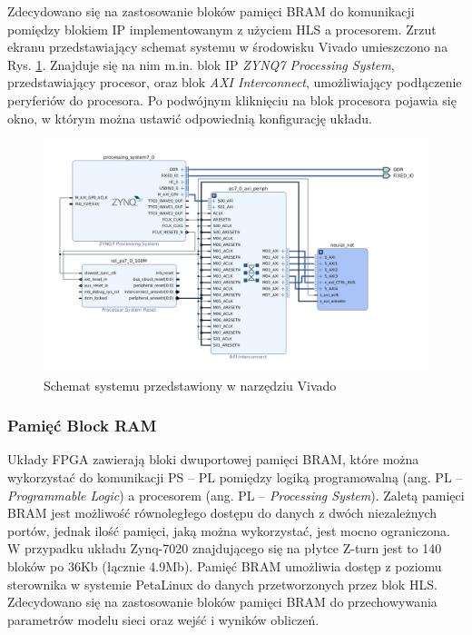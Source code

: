 Zdecydowano się na zastosowanie bloków pamięci BRAM do komunikacji pomiędzy 
blokiem IP implementowanym z użyciem HLS a procesorem. Zrzut ekranu przedstawiający 
schemat systemu w środowisku Vivado umieszczono na Rys. \ref{vivado-block-design}.
Znajduje się na nim m.in. blok IP \emph{ZYNQ7 Processing System}, przedstawiający 
procesor, oraz blok \emph{AXI Interconnect}, umożliwiający podłączenie peryferiów 
do procesora. Po podwójnym kliknięciu na blok procesora pojawia się okno, w którym
można ustawić odpowiednią konfigurację układu. 

\begin{figure}[!h]
  \centering
  \includegraphics[width=\textwidth]{img/vivado-block-design.png}
  \caption{Schemat systemu przedstawiony w narzędziu Vivado}
  \label{vivado-block-design}
\end{figure}

\subsubsection{Pamięć Block RAM}
Układy FPGA zawierają bloki dwuportowej pamięci BRAM, które można wykorzystać do komunikacji PS -- PL pomiędzy logiką programowalną (ang. PL -- \emph{Programmable Logic}) a procesorem (ang. PL -- \emph{Processing System}).
Zaletą pamięci BRAM jest możliwość równoległego dostępu do danych z dwóch niezależnych portów, jednak ilość pamięci, jaką można wykorzystać, jest mocno ograniczona. W przypadku układu Zynq-7020 znajdującego się na płytce Z-turn jest to 140 bloków po 36Kb (łącznie 4.9Mb). Pamięć BRAM umożliwia dostęp z poziomu sterownika w systemie PetaLinux do danych
przetworzonych przez blok HLS. Zdecydowano się na zastosowanie bloków pamięci BRAM do przechowywania parametrów modelu sieci oraz wejść i wyników obliczeń.

